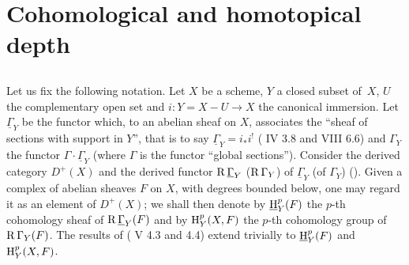 \section{Cohomological and homotopical depth}\label{XIV.1}

\setcounter{subsection}{-1}

\subsection{}\label{XIV.1.0}
Let us fix the following notation. Let $X$ be a scheme, $Y$ a closed subset of~$X$, $U$ the complementary open set and $i:Y=X-U\to X$ the canonical immersion. Let~$\underline{\Gamma}_Y$ be the functor which, to an abelian sheaf on $X$, associates the ``sheaf of sections with support in $Y$'', that is to say $\underline{\Gamma}_Y=i_*i^!$ (\cf {} IV 3.8 and VIII 6.6) and $\Gamma_Y$ the functor $\Gamma\cdot \underline{\Gamma}_Y$ (where $\Gamma$ is the functor ``global sections''). Consider the derived category $D^+(X)$ and the derived functor $\operatorname{R}\underline{\Gamma}_Y$ (\resp $\operatorname{R}\Gamma_Y$) of $\underline{\Gamma}_Y$ (\resp of $\Gamma_Y$) (\cf \cite{XIV.3}). Given a complex of abelian sheaves $F$ on $X$, with degrees bounded below, one may regard it as an element of $D^+(X)$; we shall then denote by ${\operatorname{\underline{H}}}_Y^p(F)$ the $p$-th cohomology sheaf of $\operatorname{R}\underline{\Gamma}_Y(F)$ and by $\operatorname{H}_Y^p(X, F)$ the $p$-th cohomology group of $\operatorname{R}\Gamma_Y(F)$. The results of ( V 4.3 and 4.4) extend trivially to ${\operatorname{\underline{H}}}_Y^p(F)$ and $\operatorname{H}_Y^p(X, F)$.

